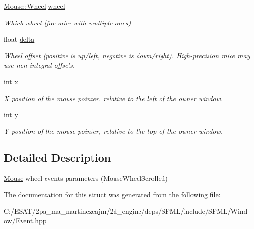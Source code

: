 \begin{DoxyCompactItemize}
\item 
\mbox{\label{structsf_1_1_event_1_1_mouse_wheel_scroll_event_a1d82dccecc46968d517b2fc66639dd74}} 
\hyperlink{classsf_1_1_mouse_a60dd479a43f26f200e7957aa11803ff4}{Mouse\+::\+Wheel} \hyperlink{structsf_1_1_event_1_1_mouse_wheel_scroll_event_a1d82dccecc46968d517b2fc66639dd74}{wheel}
\begin{DoxyCompactList}\small\item\em Which wheel (for mice with multiple ones) \end{DoxyCompactList}\item 
\mbox{\label{structsf_1_1_event_1_1_mouse_wheel_scroll_event_ac45c164997a594d424071e74b53b5817}} 
float \hyperlink{structsf_1_1_event_1_1_mouse_wheel_scroll_event_ac45c164997a594d424071e74b53b5817}{delta}
\begin{DoxyCompactList}\small\item\em Wheel offset (positive is up/left, negative is down/right). High-\/precision mice may use non-\/integral offsets. \end{DoxyCompactList}\item 
\mbox{\label{structsf_1_1_event_1_1_mouse_wheel_scroll_event_a3d17cae0568d18083f879655abdc8ae4}} 
int \hyperlink{structsf_1_1_event_1_1_mouse_wheel_scroll_event_a3d17cae0568d18083f879655abdc8ae4}{x}
\begin{DoxyCompactList}\small\item\em X position of the mouse pointer, relative to the left of the owner window. \end{DoxyCompactList}\item 
\mbox{\label{structsf_1_1_event_1_1_mouse_wheel_scroll_event_aa38bf23704162024eed19917eef3853c}} 
int \hyperlink{structsf_1_1_event_1_1_mouse_wheel_scroll_event_aa38bf23704162024eed19917eef3853c}{y}
\begin{DoxyCompactList}\small\item\em Y position of the mouse pointer, relative to the top of the owner window. \end{DoxyCompactList}\end{DoxyCompactItemize}


\subsection{Detailed Description}
\hyperlink{classsf_1_1_mouse}{Mouse} wheel events parameters (Mouse\+Wheel\+Scrolled) 

The documentation for this struct was generated from the following file\+:\begin{DoxyCompactItemize}
\item 
C\+:/\+E\+S\+A\+T/2pa\+\_\+ma\+\_\+martinezcajm/2d\+\_\+engine/deps/\+S\+F\+M\+L/include/\+S\+F\+M\+L/\+Window/Event.\+hpp\end{DoxyCompactItemize}
